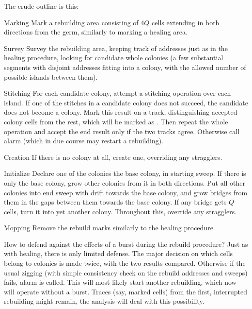 \documentclass[12pt]{memoir}
\newcommand{\authnote}[3]
{\text{{ \textcolor{#3}{\( \langle\hspace{-0.2em}\langle \)\textsf{\footnotesize #1: #2}\( \rangle\hspace{-0.2em}\rangle \)}}}}
\newcommand{\authnote}[2]{}
\newcommand{\Pnote}[1]{{\authnote{Peter}{#1}{cyan}}}
\begin{document}
The crude outline is this:
\begin{flushdescription}
 \item[Marking] Mark a rebuilding area consisting of \( 4Q \) cells \Pnote{?}
   extending in both directions from the germ, similarly to marking a healing area.

 \item[Survey] Survey the rebuilding area, 
   keeping track of addresses just as in the healing procedure,
   looking for candidate whole colonies (a few substantial segments with disjoint 
   addresses fitting into a colony, with the allowed number of possible islands 
   between them).

 \item[Stitching] For each candidate colony, attempt a stitching operation over each island.
 If one of the stitches in a candidate colony does not succeed,
 the candidate does not become a colony.
 Mark this result on a track, distinguishing accepted colony cells from the
 rest, which will be marked as .
 Then repeat the whole operation and accept the end result only if the two tracks agree.
 Otherwise call alarm (which in due course may restart a rebuilding).

\item[Creation] If there is no colony at all, create one, overriding any stragglers.
 
\item[Initialize] 
  Declare one of the colonies the base colony, in starting sweep.
  If there is only the base colony, grow other colonies from it in both directions.
  Put all other colonies into end sweep with drift towards the base colony, and
  grow bridges from them in the gaps between them towards the base colony.
  If any bridge gets \( Q \) cells, turn it into yet another colony.
  Throughout this, override any stragglers.

\item[Mopping] Remove the rebuild marks similarly to the healing procedure.
\end{flushdescription}

How to defend against the effects of a burst during the rebuild procedure?
Just as with healing, there is only limited defense.
The major decision on which cells belong to colonies is made twice, with the
two results compared.
Otherwise if the usual zigging (with simple consistency check on the rebuild addresses
and sweeps) fails, alarm is called.
This will most likely start another rebuilding, which now will operate without a burst.
Traces (say, marked cells) from the first, interrupted rebuilding might remain,
the analysis will deal with this possibility.
\end{document}
